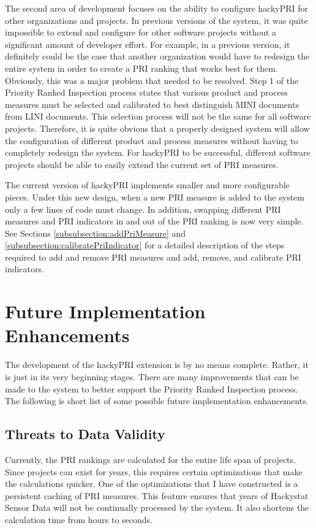 The second area of development focuses on the ability to configure hackyPRI
for other organizations and projects. In previous versions of the system,
it was quite impossible to extend and configure for other software projects
without a significant amount of developer effort. For example, in a
previous version, it definitely could be the case that another organization
would have to redesign the entire system in order to create a PRI ranking
that works best for them. Obviously, this was a major problem that needed
to be resolved. Step 1 of the Priority Ranked Inspection process states
that various product and process measures must be selected and calibrated
to best distinguish MINI documents from LINI documents. This selection
process will not be the same for all software projects. Therefore, it is
quite obvious that a properly designed system will allow the configuration
of different product and process measures without having to completely
redesign the system. For hackyPRI to be successful, different software
projects should be able to easily extend the current set of PRI measures.

The current version of hackyPRI implements smaller and more configurable
pieces. Under this new design, when a new PRI measure is added to the
system only a few lines of code must change. In addition, swapping
different PRI measures and PRI indicators in and out of the PRI ranking is
now very simple. See Sections \ref{subsubsection:addPriMeasure} and
\ref{subsubsection:calibratePriIndicator} for a detailed description of the
steps required to add and remove PRI measures and add, remove, and
calibrate PRI indicators.


\section{Future Implementation Enhancements}
\label{section:future}
The development of the hackyPRI extension is by no means complete. Rather,
it is just in its very beginning stages. There are many improvements that
can be made to the system to better support the Priority Ranked Inspection
process. The following is short list of some possible future implementation
enhancements.

\subsection{Threats to Data Validity}
Currently, the PRI rankings are calculated for the entire life span of
projects. Since projects can exist for years, this requires certain
optimizations that make the calculations quicker. One of the optimizations
that I have constructed is a persistent caching of PRI measures. This
feature ensures that years of Hackystat Sensor Data will not be continually
processed by the system. It also shortens the calculation time from hours
to seconds.

